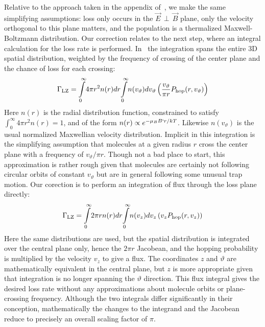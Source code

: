 \documentclass[%
 reprint,
 amsmath,amssymb,
 aps,
prl,
]{revtex4-1}
\newcommand{\epb}{{$\vec{E}\,{\perp}\,\vec{B}$}}
\begin{document}
Relative to the approach taken in the appendix of~\cite{Stuhl2013}, we make the same simplifying assumptions: loss only occurs in the \epb{} plane, only the velocity orthogonal to this plane matters, and the population is a thermalized Maxwell-Boltzmann distribution.
Our correction relates to the next step, where an integral calculation for the loss rate is performed.
In~\cite{Stuhl2013} the integration spans the entire 3D spatial distribution, weighted by the frequency of crossing of the center plane and the chance of loss for each crossing:
\begin{equation}
\Gamma_\text{LZ}=\int\displaylimits_0^\infty\!4\pi r^2n(r)dr\!\int\displaylimits_0^\infty \!n(v_\vartheta)dv_\vartheta\left( \frac{v_\vartheta}{\pi r} P_\text{hop}(r,v_\vartheta)\right)
\end{equation}
Here $n(r)$ is the radial distribution function, constrained to satisfy $\int_0^\infty 4\pi r^2n(r)=1$, and of the form $n(r)\propto e^{-\mu_BB`r/kT}$. 
Likewise $n(v_\vartheta)$ is the usual normalized Maxwellian velocity distribution. 
Implicit in this integration is the simplifying assumption that molecules at a given radius $r$ cross the center plane with a frequency of $v_\vartheta/\pi r$.
Though not a bad place to start, this approximation is rather rough given that molecules are certainly not following circular orbits of constant $v_\vartheta$ but are in general following some unusual trap motion.
Our corection is to perform an integration of flux through the loss plane directly:
\begin{equation}
\Gamma_\text{LZ}=\int\displaylimits_0^\infty\!2\pi r n(r)dr\!\int\displaylimits_0^\infty\! n(v_z)dv_z\left(v_z P_\text{hop}(r,v_z)\right)
\end{equation}
Here the same distributions are used, but the spatial distribution is integrated over the central plane only, hence the $2\pi r$ Jacobean, and the hopping probability is multiplied by the velocity $v_z$ to give a flux.
The coordinates $z$ and $\vartheta$ are mathematically equivalent in the central plane, but $z$ is more appropriate given that integration is no longer spanning the $\vartheta$ direction.
This flux integral gives the desired loss rate without any approximations about molecule orbits or plane-crossing frequency.
Although the two integrals differ significantly in their conception, mathematically the changes to the integrand and the Jacobean reduce to precisely an overall scaling factor of $\pi$.
\end{document}

